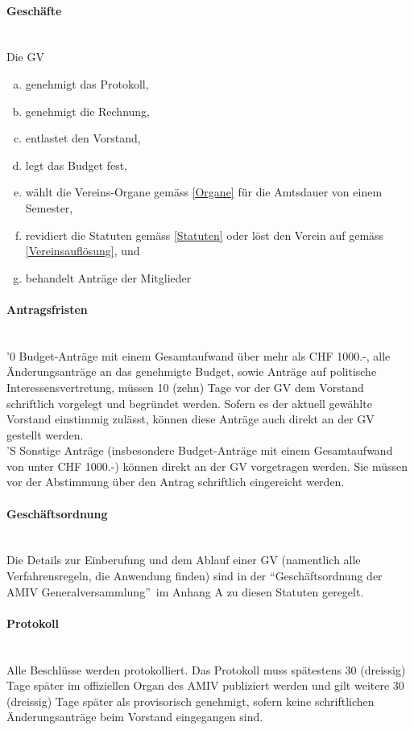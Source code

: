 \documentclass[a4paper,11pt]{article}
\newcommand{\nl}{\\[1.5ex]}
\begin{document}
\paragraph{Geschäfte} \ \\
Die GV
\begin{enumerate}[(a)]
  \item genehmigt das Protokoll,
  \item genehmigt die Rechnung,
  \item entlastet den Vorstand,
  \item legt das Budget fest,
  \item wählt die Vereins-Organe gemäss \ref{Organe} für die Amtsdauer von einem Semester,
  \item revidiert die Statuten gemäss \ref{Statuten} oder löst den Verein auf gemäss \ref{Vereinsauflösung}, und
  \item behandelt Anträge der Mitglieder
\end{enumerate}


\paragraph{Antragsfristen}\label{Antragsfristen} \ \\
'0 Budget-Anträge mit einem Gesamtaufwand über mehr als CHF 1000.-, alle Änderungsanträge an das genehmigte Budget, sowie Anträge auf politische Interessensvertretung, müssen 10 (zehn) Tage vor der GV dem Vorstand schriftlich vorgelegt und begründet werden. Sofern es der aktuell gewählte Vorstand einstimmig zulässt, können diese Anträge auch direkt an der GV gestellt werden. \nl
'S Sonstige Anträge (insbesondere Budget-Anträge mit einem Gesamtaufwand von unter CHF 1000.-) können direkt an der GV vorgetragen werden. Sie müssen vor der Abstimmung über den Antrag schriftlich eingereicht werden.


\paragraph{Geschäftsordnung} \ \\
Die Details zur Einberufung und dem Ablauf einer GV (namentlich alle Verfahrensregeln, die Anwendung finden) sind in der ``Geschäftsordnung der AMIV Generalversammlung''\ im Anhang A zu diesen Statuten geregelt.


\paragraph{Protokoll} \ \\
Alle Beschlüsse werden protokolliert. Das Protokoll muss spätestens 30 (dreissig) Tage später im offiziellen Organ des AMIV publiziert werden und gilt weitere 30 (dreissig) Tage später als provisorisch genehmigt, sofern keine schriftlichen Änderungsanträge beim Vorstand eingegangen sind.
\end{document}
